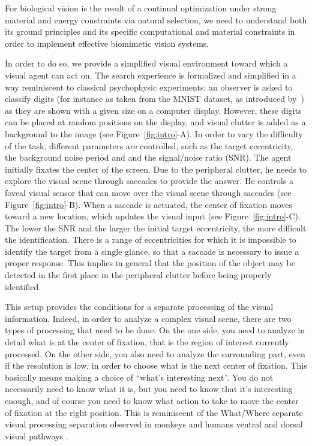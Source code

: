 
For biological vision is the result of a continual optimization under strong material and energy constraints via natural selection, we need to understand both its ground principles and its specific computational and material constraints in order to implement effective biomimetic vision systems.

In order to do so, we provide a simplified visual environment toward which a visual agent can act on.
The search experience is formalized and simplified in a way reminiscent to classical psychophysic experiments: an observer is asked to classify digits (for instance as taken from the MNIST dataset, as introduced by~\cite{Lecun1998}) as they are shown with a given size on a computer display.
However, these digits can be placed at random positions on the display, and visual clutter is added as a background to the image (see Figure~\ref{fig:intro}-A).
In order to vary the difficulty of the task, different parameters are controlled, such as the target eccentricity, the background noise period and and the signal/noise ratio (SNR).
The agent initially fixates the center of the screen. Due to the peripheral clutter, he needs to explore the visual scene through saccades to provide the answer. He controls a foveal visual sensor that can move over the visual scene through saccades (see Figure~\ref{fig:intro}-B). When a saccade is actuated, the center of fixation moves toward a new location, which updates the visual input (see Figure~\ref{fig:intro}-C).
The lower the SNR and the larger the initial target eccentricity, the more difficult the identification. There is a range of eccentricities for which it is impossible to identify the target from a single glance, so that a saccade is necessary to issue a proper response.
This implies in general that the position of the object may be detected in the first place in the peripheral clutter before being properly identified.

This setup provides the conditions for a separate processing of the visual information.
Indeed, in order to analyze a complex visual scene, there are two types of processing that need to be done. On the one side, you need  to analyze in detail what is at the center of fixation, that is the region of interest currently processed. On the other side, you also need to analyze the surrounding part, even if the resolution is low, in order to choose what is the next center of fixation. This basically means making a choice of “what’s interesting next”. You do not necessarily need to know what it is, but you need to know that it’s interesting enough, and of course you need to know what action to take to move the center of fixation at the right position. This is reminiscent of the What/Where separate visual processing separation observed in monkeys and humans ventral and dorsal visual pathways \cite{mishkin1983object}.


